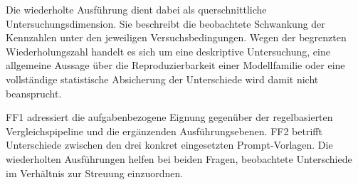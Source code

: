 Die wiederholte Ausführung dient dabei als querschnittliche Untersuchungsdimension. Sie beschreibt die beobachtete Schwankung der Kennzahlen unter den jeweiligen Versuchsbedingungen. Wegen der begrenzten Wiederholungszahl handelt es sich um eine deskriptive Untersuchung, eine allgemeine Aussage über die Reproduzierbarkeit einer Modellfamilie oder eine vollständige statistische Absicherung der Unterschiede wird damit nicht beansprucht.

FF1 adressiert die aufgabenbezogene Eignung gegenüber der regelbasierten Vergleichspipeline und die ergänzenden Ausführungsebenen. FF2 betrifft Unterschiede zwischen den drei konkret eingesetzten Prompt-Vorlagen. Die wiederholten Ausführungen helfen bei beiden Fragen, beobachtete Unterschiede im Verhältnis zur Streuung einzuordnen.